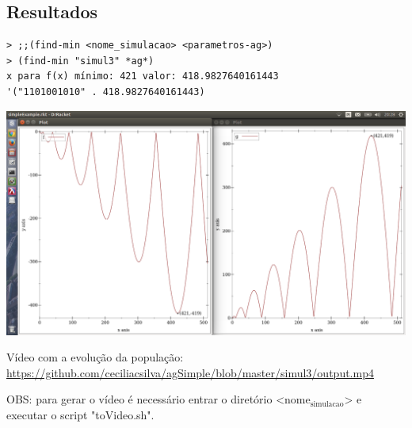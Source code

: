 \documentclass[11pt]{article}
\begin{document}
\subsection{Resultados}
\label{sec-1-3}

\begin{verbatim}
> ;;(find-min <nome_simulacao> <parametros-ag>)
> (find-min "simul3" *ag*)
x para f(x) mínimo: 421 valor: 418.9827640161443
'("1101001010" . 418.9827640161443)
\end{verbatim}

\includegraphics[width=.9\linewidth]{imagens/ag-fgs3.png}

Vídeo com a evolução da população: \url{https://github.com/ceciliacsilva/agSimple/blob/master/simul3/output.mp4}

OBS: para gerar o vídeo é necessário entrar o diretório <nome$_{\text{simulacao}}$> e executar o script "toVideo.sh".
\end{document}
